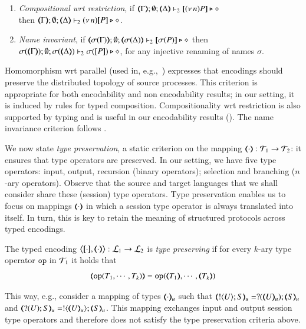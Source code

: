 \documentclass[runningheads]{llncs}
\begin{document}
{\begin{definition}
\begin{enumerate}[1.]
		\item	\emph{Compositional wrt restriction},  if 
		$\mapt{\Gamma}; \emptyset; \mapt{\Delta} \proves_2 \map{\news{n}P} \hastype \Proc$ \\
		then 
		$\mapt{\Gamma}; \emptyset; \mapt{\Delta} \proves_2 \news{n}\map{P} \hastype \Proc$.
		
		\item \emph{Name invariant},   if
		$\mapt{\sigma(\Gamma)}; \emptyset; \mapt{\sigma(\Delta)} \proves_2 \map{\sigma(P)} \hastype \Proc$
		then \\
		$\sigma(\mapt{\Gamma}); \emptyset; \sigma(\mapt{\Delta}) \proves_2 \sigma(\map{P}) \hastype \Proc$, 
		for any injective renaming  of names $\sigma$.
	\end{enumerate}
\end{definition}

\smallskip 

\noi Homomorphism wrt parallel (used in, e.g.,~\cite{Palamidessi03,DBLP:conf/lics/PalamidessiSVV06})
expresses that encodings should preserve the distributed topology of source processes. This criterion
 is appropriate for both encodability and non encodability results; in our setting, it is
induced by rules for typed composition.
Compositionality wrt restriction 
is also supported by typing and is 
useful in our encodability results ().
The name invariance criterion follows \cite{DBLP:journals/iandc/Gorla10,DBLP:conf/icalp/LanesePSS10}. 

We now state \emph{type preservation}, a static criterion on the mapping 
$(\!\!\langle\cdot\rangle\!\!): {\cal{T}}_1 \to {\cal{T}}_2$: %
it ensures that type operators are preserved.
In our setting, 
we have five type operators: input, output, recursion (binary operators); selection and 
branching ($n$-ary operators). 
Observe that the source and target languages that we shall consider share these (session) type operators.
Type preservation enables us to focus on 
mappings $(\!\!\langle\cdot\rangle\!\!)$ in which a session type operator is always translated into itself. 
In turn, this is key to retain the meaning of structured protocols across typed encodings.

\begin{definition}
	\label{def:tp}
	The typed encoding 
	$\enco{\map{\cdot}, \mapt{\cdot}}: \tyl{L}_1 \to \tyl{L}_2$ is \emph{type preserving}
	if for every $k$-ary type operator $\mathtt{op}$ in ${\cal{T}}_1$ it holds that 
	 $$\mapt{\mathtt{op}(T_1, \cdots, T_k)} = \mathtt{op}(\mapt{T_1}, \cdots, \mapt{T_k})$$
	\end{definition}
This way, e.g., 
consider a mapping of types $(\!\!\langle\cdot\rangle\!\!)_u$ such that 
$\mapt{\btout{U} S}_u = \btinp{\mapt{U}_u} \mapt{S}_u$ 
and 
$\mapt{\btinp{U} S}_u = \btout{\mapt{U}_u} \mapt{S}_u$. This mapping exchanges
input and output session type operators and therefore does not
satisfy the type preservation criteria above. %

}
\end{document}
